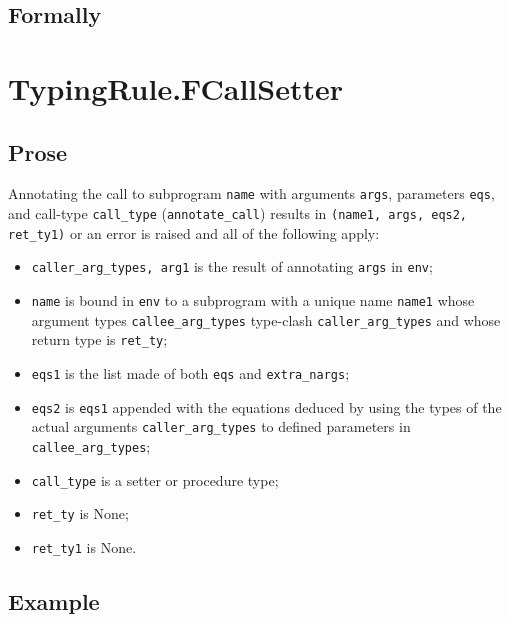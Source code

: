 \documentclass{book}
\begin{document}
\begin{emptyformal}
    \subsection{Formally}
\end{emptyformal}



\section{TypingRule.FCallSetter \label{sec:TypingRule.FCallSetter}}

  \subsection{Prose}
  Annotating the call to subprogram \texttt{name} with arguments \texttt{args},
  parameters \texttt{eqs}, and call-type \texttt{call\_type}
  (\texttt{annotate\_call}) results in \texttt{(name1, args, eqs2, ret\_ty1)}
  or an error is raised and all of the following apply:
  \begin{itemize}
    \item \texttt{caller\_arg\_types, arg1} is the result of annotating
      \texttt{args} in \texttt{env};
    \item \texttt{name} is bound in \texttt{env} to a subprogram with a unique
      name \texttt{name1} whose argument types \texttt{callee\_arg\_types}
      type-clash \texttt{caller\_arg\_types} and whose return type is
      \texttt{ret\_ty};
    \item \texttt{eqs1} is the list made of both \texttt{eqs} and
      \texttt{extra\_nargs};
    \item \texttt{eqs2} is \texttt{eqs1} appended with the equations deduced by
      using the types of the actual arguments \texttt{caller\_arg\_types} to
      defined parameters in \texttt{callee\_arg\_types};
    \item \texttt{call\_type} is a setter or procedure type;
    \item \texttt{ret\_ty} is None;
    \item \texttt{ret\_ty1} is None.
  \end{itemize}

  \subsection{Example}
\end{document}
